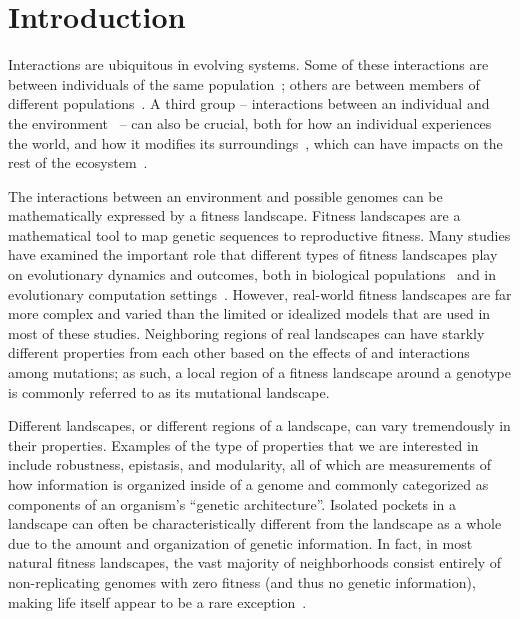 \documentclass[10pt,letterpaper,final]{article}
\begin{document}
\linenumbers

\section*{Introduction}
Interactions are ubiquitous in evolving systems.  Some of these interactions are between individuals of the same population~\cite{smith_group_1964,smith_fine-scale_2016,aubert-kato_hunger_2015,trivers_evolution_1971,ale_evolution_2013}; others are between members of different populations~\cite{friman_relative_2016,dobramysl_stochastic_2018,zaman_coevolution_2014}.  
A third group -- interactions between an individual and the environment~\cite{pigliucci_phenotypic_2001,ofria_evolutionary_2016,lalejini_gene_2017} -- can also be crucial, both for how an individual experiences the world, and how it modifies its surroundings~\cite{odling-smee_niche_1996,rocabert_beware_2017}, which can have impacts on the rest of the ecosystem~\cite{paine_note_1969,hale_sarah_l._ecosystem-level_2018}.  

The interactions between an environment and possible genomes can be mathematically expressed by a fitness landscape.
Fitness landscapes are a mathematical tool to map genetic sequences to reproductive fitness. Many studies have examined the important role that different types of fitness landscapes play on evolutionary dynamics and outcomes, both in biological populations~\cite{khan_negative_2011,szendro_quantitative_2013,weinreich_darwinian_2006,nahum_tortoisehare_2015} and in evolutionary computation settings~\cite{merz_fitness_2000,humeau_paradiseo-mo:_2013,kallel_theoretical_2013}. However, real-world fitness landscapes are far more complex and varied than the limited or idealized models that are used in most of these studies. Neighboring regions of real landscapes can have starkly different properties from each other based on the effects of and interactions among mutations; as such, a local region of a fitness landscape around a genotype is commonly referred to as its mutational landscape.%

Different landscapes, or different regions of a landscape, can vary tremendously in their properties. Examples of the type of properties that we are interested in include robustness, epistasis, and modularity, all of which are measurements of how information is organized inside of a genome and commonly categorized as components of an organism's ``genetic architecture''. Isolated pockets in a landscape can often be characteristically different from the landscape as a whole due to the amount and organization of genetic information. In fact, in most natural fitness landscapes, the vast majority of neighborhoods consist entirely of non-replicating genomes with zero fitness (and thus no genetic information), making life itself appear to be a rare exception~\cite{gavrilets_fitness_2004}.
\end{document}
